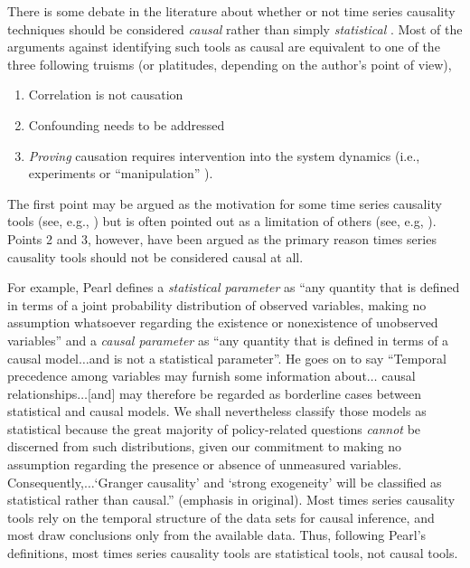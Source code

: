 \documentclass{article}[10pt]
\begin{document}
There is some debate in the literature about whether or not time series causality techniques should be considered {\em causal} rather than simply {\em statistical} \cite{Chen2013,Pearl2000,Bollen2013}.  Most of the arguments against identifying such tools as causal are equivalent to one of the three following truisms (or platitudes, depending on the author's point of view), 
\begin{enumerate}
\item Correlation is not causation
\item Confounding needs to be addressed
\item {\em Proving} causation requires intervention into the system dynamics (i.e., experiments or ``manipulation'' \cite{Holland1986}).
\end{enumerate}
The first point may be argued as the motivation for some time series causality tools (see, e.g., \cite{Granger2003}) but is often pointed out as a limitation of others (see, e.g, \cite{Rogosa1980}).  Points 2 and 3, however, have been argued as the primary reason times series causality tools should not be considered causal at all.  

For example, Pearl \cite{Pearl2000} defines a {\em statistical parameter} as ``any quantity that is defined in terms of a joint probability distribution of observed variables, making no assumption whatsoever regarding the existence or nonexistence of unobserved variables'' and a {\em causal parameter} as ``any quantity that is defined in terms of a causal model$\ldots$and is not a statistical parameter''.  He goes on to say ``Temporal precedence among variables may furnish some information about$\ldots$ causal relationships$\ldots$[and] may therefore be regarded as borderline cases between statistical and causal models.  We shall nevertheless classify those models as statistical because the great majority of policy-related questions {\em cannot} be discerned from such distributions, given our commitment to making no assumption regarding the presence or absence of unmeasured variables.  Consequently,$\ldots$`Granger causality' and `strong exogeneity' will be classified as statistical rather than causal.'' (emphasis in original).  Most times series causality tools rely on the temporal structure of the data sets for causal inference, and most draw conclusions only from the available data. Thus, following Pearl's definitions, most times series causality tools are statistical tools, not causal tools.
\end{document}
